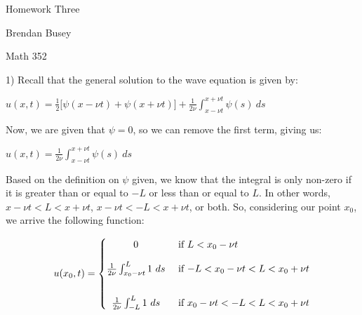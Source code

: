 \documentclass[executivepaper]{article}
\begin{document}
\vspace*{-40mm}

\begin{center}

Homework Three 

\end{center}

\begin{flushright}

Brendan Busey

Math 352

\end{flushright}

\begin{flushleft}

1) Recall that the general solution to the wave equation is given by:

\begin{center}

$u(x,t)=\frac{1}{2} \big[\psi(x-\nu t)+\psi(x+\nu t)\big] + \frac{1}{2\nu} \int_{x-\nu t}^{x+\nu t} \psi(s) \ ds$

\end{center}

Now, we are given that $\psi=0$, so we can remove the first term, giving us:

\begin{center}

$u(x,t)=\frac{1}{2\nu} \int_{x-\nu t}^{x+\nu t} \psi(s) \ ds$

\end{center}

Based on the definition on $\psi$ given, we know that the integral is only non-zero if it is greater than or equal to $-L$ or less than or equal to $L$. In other words, $x-\nu t < L < x+\nu t$, $x-\nu t < -L < x+\nu t$, or both. So, considering our point $x_{0}$, we arrive the following function: 

\begin{center}

\[
 u(x_{0},t)=
  \begin{cases} 
      \hfill 0    \hfill & \text{ if $L < x_{0}-\nu t$} \\[1em]
      
      \hfill \frac{1}{2\nu} \int_{x_{0}-\nu t}^{L} 1 \ ds \hfill & \text{ if $-L < x_{0}-\nu t < L < x_{0}+\nu t$} \\[2em]
      
      \hfill \frac{1}{2\nu} \int_{-L}^{L} 1 \ ds \hfill & \text{ if $x_{0}-\nu t < -L < L < x_{0}+\nu t$}
  \end{cases}
\]


\end{center}
\end{flushleft}
\end{document}
